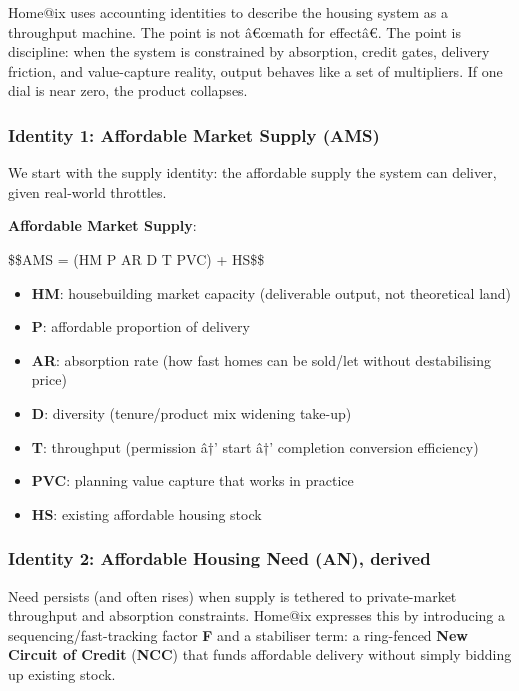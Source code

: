 Home@ix uses accounting identities to describe the housing system as a
throughput machine. The point is not â€œmath for effectâ€. The point is
discipline: when the system is constrained by absorption, credit gates,
delivery friction, and value-capture reality, output behaves like a set
of multipliers. If one dial is near zero, the product collapses.

\protect{}\label{homeix-identity-ams}
\subsubsection{Identity 1: Affordable Market Supply
(AMS)}\label{identity-1-affordable-market-supply-ams}

We start with the supply identity: the affordable supply the system can
deliver, given real-world throttles.

\textbf{Affordable Market Supply}:

\$\$AMS = (HM \cdot P \cdot AR \cdot D \cdot T \cdot PVC) + HS\$\$

\begin{itemize}
\tightlist
\item
  \textbf{HM}: housebuilding market capacity (deliverable output, not
  theoretical land)
\item
  \textbf{P}: affordable proportion of delivery
\item
  \textbf{AR}: absorption rate (how fast homes can be sold/let without
  destabilising price)
\item
  \textbf{D}: diversity (tenure/product mix widening take-up)
\item
  \textbf{T}: throughput (permission â†' start â†' completion conversion
  efficiency)
\item
  \textbf{PVC}: planning value capture that works in practice
\item
  \textbf{HS}: existing affordable housing stock
\end{itemize}

\protect{}\label{homeix-identity-an}
\subsubsection{Identity 2: Affordable Housing Need (AN),
derived}\label{identity-2-affordable-housing-need-an-derived}

Need persists (and often rises) when supply is tethered to
private-market throughput and absorption constraints. Home@ix expresses
this by introducing a sequencing/fast-tracking factor \textbf{F} and a
stabiliser term: a ring-fenced \textbf{New Circuit of Credit}
(\textbf{NCC}) that funds affordable delivery without simply bidding up
existing stock.


